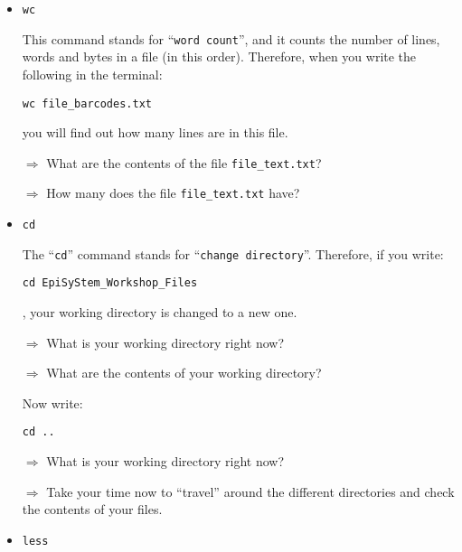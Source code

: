 \documentclass[11pt]{article}
\begin{document}
\begin{itemize}
\item \texttt{wc}

This command stands for ``\texttt{word count}'', and it counts the number of lines, words and bytes in a file (in this order). Therefore, when you write the following in the terminal:
\begin{verbatim}
wc file_barcodes.txt
\end{verbatim}
you will find out how many lines are in this file. 

\vspace{1em}
\hrulefill

$\Rightarrow$ What are the contents of the file \texttt{file\_text.txt}?

$\Rightarrow$ How many does the file \texttt{file\_text.txt} have?

\hrulefill
\vspace{1em}

\item \texttt{cd}

The ``\texttt{cd}'' command stands for ``\texttt{change directory}''. Therefore, if you write:

\begin{verbatim}
cd EpiSyStem_Workshop_Files
\end{verbatim}

, your working directory is changed to a new one. 

\vspace{1em}
\hrulefill

$\Rightarrow$ What is your working directory right now?

$\Rightarrow$ What are the contents of your working directory?

\hrulefill
\vspace{1em}

Now write:

\begin{verbatim}
cd ..
\end{verbatim}

\vspace{1em}
\hrulefill

$\Rightarrow$ What is your working directory right now?

$\Rightarrow$ Take your time now to ``travel'' around the different directories and check the contents of your files. 

\hrulefill
\vspace{1em}

\item \texttt{less}


\end{itemize}
\end{document}
